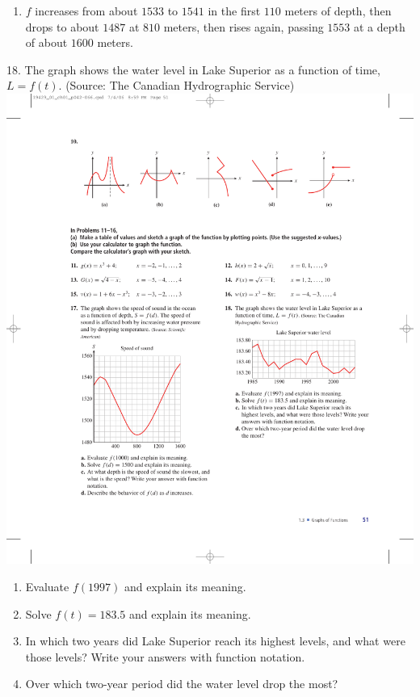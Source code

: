 \documentclass[10pt,]{book}
\theoremstyle{plain}
\theoremstyle{definition}
\theoremstyle{definition}
\theoremstyle{definition}
\theoremstyle{definition}
\numberwithin{equation}{part}
\begin{document}
\begin{exerciselist}
\begin{enumerate}[label=*\alph**]
\item\hypertarget{li-723}{}\(f\) increases from about \(1533\) to \(1541\) in the first \(110\) meters of depth, then drops to about \(1487\) at \(810\) meters, then rises again, passing \(1553\) at a depth of about \(1600\) meters.%
\end{enumerate}
%
\item[18.]\hypertarget{exercise-175}{}The graph shows the water level in Lake Superior as a function of time, \(L = f (t)\). (Source: The Canadian Hydrographic Service) \includegraphics[width=0.7\linewidth]{images/fig-ex-1-3-18}
 \leavevmode%
\begin{enumerate}[label=*\alph**]
\item\hypertarget{li-724}{}Evaluate \(f (1997)\) and explain its meaning.%
\item\hypertarget{li-725}{}Solve \(f (t) = 183.5\) and explain its meaning.%
\item\hypertarget{li-726}{}In which two years did Lake Superior reach its highest levels, and what were those levels? Write your answers with function notation.%
\item\hypertarget{li-727}{}Over which two-year period did the water level drop the most?%
\end{enumerate}
%
\par\smallskip

\end{exerciselist}
\end{document}
